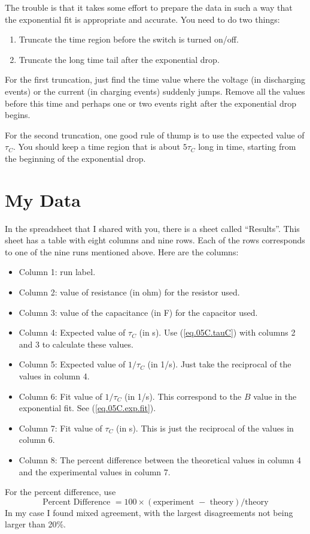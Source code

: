The trouble is that it takes some effort to prepare the data in such a way that the exponential fit is appropriate and accurate. You need to do two things:
\begin{enumerate}
	\item Truncate the time region before the switch is turned on/off.
	\item Truncate the long time tail after the exponential drop.
\end{enumerate}
For the first truncation, just find the time value where the voltage (in discharging events) or the current (in charging events) suddenly jumps. Remove all the values before this time and perhaps one or two events right after the exponential drop begins.

For the second truncation, one good rule of thump is to use the expected value of $\tau_{C}$. You should keep a time region that is about $5\tau_{C}$ long in time, starting from the beginning of the exponential drop.
%
\section{My Data}
%
In the spreadsheet that I shared with you, there is a sheet called ``Results''. This sheet has a table with eight columns and nine rows. Each of the rows corresponds to one of the nine runs mentioned above. Here are the columns:
\begin{itemize}
	\item Column 1: run label.
	\item Column 2: value of resistance (in ohm) for the resistor used.
	\item Column 3: value of the capacitance (in F) for the capacitor used.
	\item Column 4: Expected value of $\tau_{C}$ (in s). Use (\ref{eq.05C.tauC}) with columns 2 and 3 to calculate these values.
	\item Column 5: Expected value of $1 / \tau_{C}$ (in 1/s). Just take the reciprocal of the values in column 4.
	\item Column 6: Fit value of $1 / \tau_{C}$ (in 1/s). This correspond to the $B$ value in the exponential fit. See (\ref{eq.05C.exp.fit}).
	\item Column 7: Fit value of $\tau_{C}$ (in s). This is just the reciprocal of the values in column 6.
	\item Column 8: The percent difference between the theoretical values in column 4 and the experimental values in column 7.
\end{itemize}
For the percent difference, use
\begin{equation}
	\text{Percent Difference } = 100 \times (\text{experiment } - \text{ theory}) / \text{theory}
\end{equation}
In my case I found mixed agreement, with the largest disagreements not being larger than 20\%.
%
